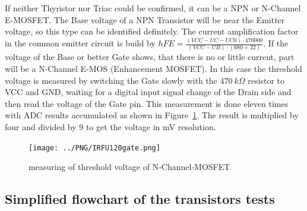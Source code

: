 If neither Thyristor nor Triac could be confirmed, it can be a NPN or N-Channel E-MOSFET.
The Base voltage of a NPN Transistor will be near the Emitter voltage, so this type can be
identified definitely.
The current amplification factor in the common emitter circuit is build by
\(hFE = \frac{(VCC-UC-UC0)\cdot 470000}{(VCC-UB)\cdot (680+22)}\).
If the voltage of the Base or better Gate  shows, that there is no or little current, part will be a N-Channel E-MOS 
(Enhancement MOSFET).
 In this case the threshold voltage is measured by switching the Gate slowly with
the \(470~k\Omega\) resistor to VCC and GND, waiting for a digital input signal change of the Drain side and
then read the voltage of the Gate pin.
This measurement is done eleven times with ADC results accumulated as shown in Figure~\ref{fig:eleven}.
The result is multiplied by four and divided by 9 to get the voltage in mV resolution.

\begin{figure}[H]
\centering
\texttt{[image: ../PNG/IRFU120gate.png]}
\caption{measuring of threshold voltage of N-Channel-MOSFET}
\label{fig:eleven}
\end{figure}

\subsection{Simplified flowchart of the transistors tests}

